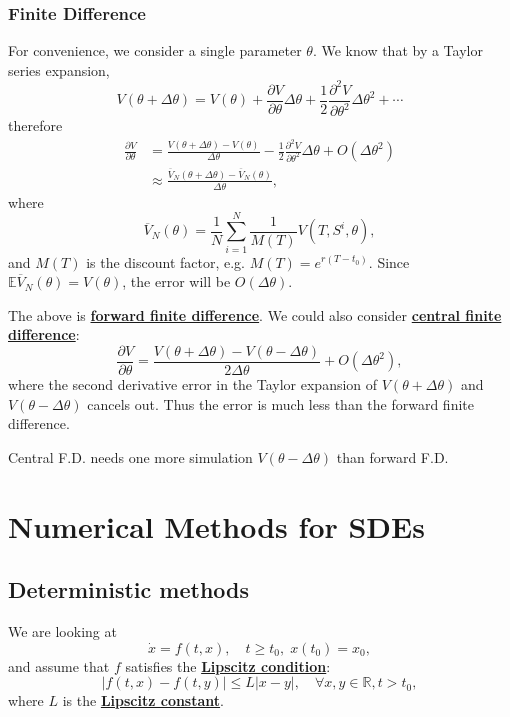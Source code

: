 \documentclass[twocolumn,landscape,10pt]{article}
\theoremstyle{definition}
\begin{document}
\subsubsection{Finite Difference}

For convenience, we consider a single parameter $\theta$.
We know that by a Taylor series expansion,
\[
    V(\theta+\Delta\theta)=V(\theta)+\frac{\partial V}{\partial
    \theta}\Delta\theta
    +\frac{1}{2}\frac{\partial^2V}{\partial \theta^2}\Delta\theta^2+\cdots
\]
therefore
\begin{align*}
    \frac{\partial V}{\partial \theta}
    &=\frac{V(\theta+\Delta\theta)-V(\theta)}{\Delta\theta}
    -\frac{1}{2}\frac{\partial^2V}{\partial
    \theta^2}\Delta\theta+O(\Delta\theta^2)\\
    &\approx
    \frac{\overline{V}_N(\theta+\Delta\theta)-\overline{V}_N(\theta)}{\Delta\theta},
\end{align*}
where
\[
    \overline{V}_N(\theta)=\frac{1}{N}\sum_{i=1}^{N}\frac{1}{M(T)}V(T,S^i,\theta),
\]
and $M(T)$ is the discount factor, e.g. $M(T)=e^{r(T-t_0)}$.
Since $\mathbb{E}\overline{V}_N(\theta)=V(\theta)$, the error will be
$O(\Delta\theta)$.

The above is \textbf{\underline{forward finite difference}}. We could also
consider \textbf{\underline{central finite difference}}:
\[
    \frac{\partial V}{\partial \theta}=
    \frac{V(\theta+\Delta\theta)-V(\theta-\Delta\theta)}{2\Delta\theta}
    +O(\Delta\theta^2),
\]
where the second derivative error in the Taylor expansion of 
$V(\theta+\Delta\theta)$ and $V(\theta-\Delta\theta)$ cancels out.
Thus the error is much less than the forward finite difference.

Central F.D. needs one more simulation $V(\theta-\Delta\theta)$ than forward
F.D.


\section{Numerical Methods for SDEs}

\subsection{Deterministic methods}

We are looking at
\[
    \dot{x}=f(t,x),\quad
    t\ge t_0,\;x(t_0)=x_0,
\]
and assume that $f$ satisfies the \textbf{\underline{Lipscitz condition}}:
\[
    |f(t,x)-f(t,y)|\le L|x-y|,\quad\forall x,y\in\mathbb{R}, t>t_0,
\]
where $L$ is the \textbf{\underline{Lipscitz constant}}.
\end{document}
